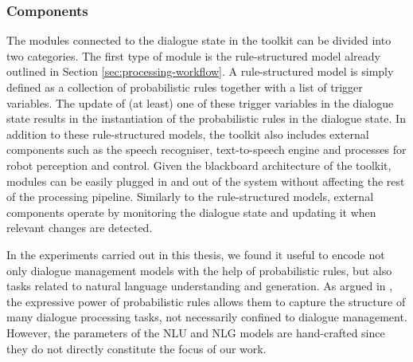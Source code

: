 \subsubsection*{Components}

The modules connected to the dialogue state in the \opendial{} toolkit can be divided into two categories. The first type of module is the rule-structured model already outlined in Section \ref{sec:processing-workflow}.  A rule-structured model is simply defined as a collection of probabilistic rules together with a list of trigger variables.  The update of (at least) one of these trigger variables in the dialogue state results in the instantiation of the probabilistic rules in the dialogue state. In addition to these rule-structured models, the \opendial{} toolkit also includes external components such as the speech recogniser, text-to-speech engine and processes for robot perception and control. Given the blackboard architecture of the toolkit, modules can be easily plugged in and out of the system without affecting the rest of the processing pipeline. Similarly to the rule-structured models, external components operate by monitoring the dialogue state and updating it when relevant changes are detected. 

In the experiments carried out in this thesis, we found it useful to encode not only dialogue management models with the help of probabilistic rules, but also tasks related to natural language understanding and generation. As argued in \cite{lison-semdial2012}, the expressive power of probabilistic rules allows them to capture the structure of many dialogue processing tasks, not necessarily confined to dialogue management. However, the parameters of the NLU and NLG models are hand-crafted since they do not directly constitute the focus of our work. 



